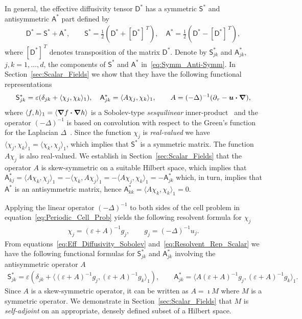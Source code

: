 \documentclass[leqno,onefignum,onetabnum]{siamltex1213}
\newcommand{\secref}[1]{Section~\ref{#1}}
\newcommand{\Dm}{\mathsf{D}}
\newcommand{\Sm}{\mathsf{S}}
\newcommand{\Am}{\mathsf{A}}
\newcommand\bnabla{\mbox{\boldmath${\nabla}$}}
\providecommand\bcdot{\boldsymbol{\cdot}}
\newcommand{\vecu}{\boldsymbol{u}}
\begin{document}
In general, the effective diffusivity tensor $\Dm^*$ has a symmetric
$\Sm^*$ and antisymmetric $\Am^*$ part defined by 
%
\begin{align}\label{eq:Symm_Anti-Symm}
  \Dm^*=\Sm^*+\Am^*,\qquad
  \Sm^*=\frac{1}{2}\left(\Dm^*+[\Dm^*]^{\,T}\right), \quad
  \Am^*=\frac{1}{2}\left(\Dm^*-[\Dm^*]^{\,T}\right),
\end{align}
%
where $[\Dm^*]^{\,T}$ denotes transposition of the matrix
$\Dm^*$. Denote by $\Sm^*_{jk}$ and $\Am^*_{jk}$, $j,k=1,\ldots,d$, the
components of $\Sm^*$ and $\Am^*$ in~\eqref{eq:Symm_Anti-Symm}. In
\secref{sec:Scalar_Fields} we show that they have the following
functional representations~\cite{Pavliotis:PHD_Thesis} 
%
\begin{align}\label{eq:Eff_Diffusivity_Sobolev}
  \Sm^*_{jk}=\varepsilon(\delta_{jk}+\langle\chi_j,\chi_k\rangle_1),
  \quad
  \Am^*_{jk}=\langle A\chi_j,\chi_k\rangle_1,
  \qquad
  A=(-\Delta)^{-1}(\partial_\tau-\vecu \bcdot\bnabla),
\end{align}
%
where $\langle f,h\rangle_1=\langle\bnabla f\bcdot\bnabla h\rangle$ is a Sobolev-type
\emph{sesquilinear} inner-product~\cite{McOwen:2003:PDE} and the
operator $(-\Delta)^{-1}$ is based on convolution with respect to the
Green's function for the Laplacian $\Delta$~\cite{Stakgold:BVP:2000}.  
Since the function $\chi_j$ is
\emph{real-valued} we have $\langle\chi_j,\chi_k\rangle_1=\langle\chi_k,\chi_j\rangle_1$, which implies that
$\Sm^*$ is a symmetric matrix. The function $A\chi_j$ is also
real-valued. We establish in \secref{sec:Scalar_Fields} that the
operator $A$ is skew-symmetric on a suitable Hilbert space, which
implies that
$\Am^*_{kj}=\langle A\chi_k,\chi_j\rangle_1=-\langle\chi_k,A\chi_j\rangle_1=-\langle A\chi_j,\chi_k\rangle_1=-\Am^*_{jk}$
which, in turn, implies that $\Am^*$ is an antisymmetric matrix, hence
$\Am^*_{kk}=\langle A\chi_k,\chi_k\rangle_1=0$.  



Applying the linear operator $(-\Delta)^{-1}$ to both sides of the cell
problem in equation~\eqref{eq:Periodic_Cell_Prob} yields the following
resolvent formula for $\chi_j$
%
\begin{align}\label{eq:Resolvent_Rep_Scalar}
  \chi_j=(\varepsilon+A)^{-1}g_j, \qquad 
  g_j=(-\Delta)^{-1}u_j.
\end{align}
%
From equations~\eqref{eq:Eff_Diffusivity_Sobolev}
and~\eqref{eq:Resolvent_Rep_Scalar} we have the following functional
formulas for $\Sm^*_{jk}$ and $\Am^*_{jk}$ involving the
antisymmetric operator $A$
%
\begin{align}\label{eq:Eff_Diff_Resolvent_Sobolev}
 \Sm^*_{jk}=\varepsilon\left(\delta_{jk}
  +\langle(\varepsilon+A)^{-1}g_j,(\varepsilon+A)^{-1}g_k\rangle_1\right), 
  \qquad
 \Am^*_{jk}=\langle A(\varepsilon+A)^{-1}g_j,(\varepsilon+A)^{-1}g_k\rangle_1.
\end{align}
%
Since $A$ is a skew-symmetric operator, it can be written as $A=\imath M$
where $M$ is a symmetric operator. We demonstrate in
\secref{sec:Scalar_Fields} that $M$ is \emph{self-adjoint} on an
appropriate, densely defined subset of a Hilbert space.
\end{document}
